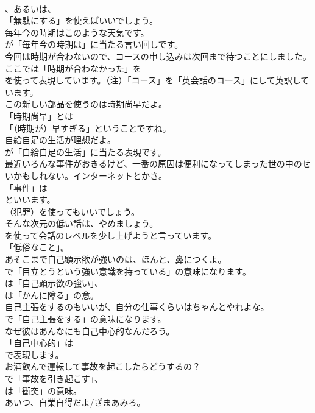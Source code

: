\documentclass[8pt]{extreport}
\begin{document}
\begin{CJK}{UTF8}{min}
\\	、あるいは、
\\	「無駄にする」を使えばいいでしょう。	
\\	毎年今の時期はこのような天気です。 
\\	が「毎年今の時期は」に当たる言い回しです。	
\\	今回は時期が合わないので、コースの申し込みは次回まで待つことにしました。 
\\	ここでは「時期が合わなかった」を 
\\	を使って表現しています。（注）「コース」を「英会話のコース」にして英訳しています。	
\\	この新しい部品を使うのは時期尚早だよ。 
\\	「時期尚早」とは
\\	「（時期が）早すぎる」ということですね。	
\\	自給自足の生活が理想だよ。 
\\	が「自給自足の生活」に当たる表現です。	
\\	最近いろんな事件がおきるけど、一番の原因は便利になってしまった世の中のせいかもしれない。インターネットとかさ。 
\\	「事件」は 
\\	といいます。
\\	（犯罪）を使ってもいいでしょう。	
\\	そんな次元の低い話は、やめましょう。 
\\	を使って会話のレベルを少し上げようと言っています。
\\	「低俗なこと」。	
\\	あそこまで自己顕示欲が強いのは、ほんと、鼻につくよ。 
\\	で「目立とうという強い意識を持っている」の意味になります。
\\	は「自己顕示欲の強い」、
\\	は「かんに障る」の意。	
\\	自己主張をするのもいいが、自分の仕事くらいはちゃんとやれよな。 
\\	で「自己主張をする」の意味になります。	
\\	なぜ彼はあんなにも自己中心的なんだろう。 
\\	「自己中心的」は 
\\	で表現します。	
\\	お酒飲んで運転して事故を起こしたらどうするの？ 
\\	で「事故を引き起こす」、
\\	は「衝突」の意味。	
\\	あいつ、自業自得だよ/ざまあみろ。 

\end{CJK}
\end{document}
